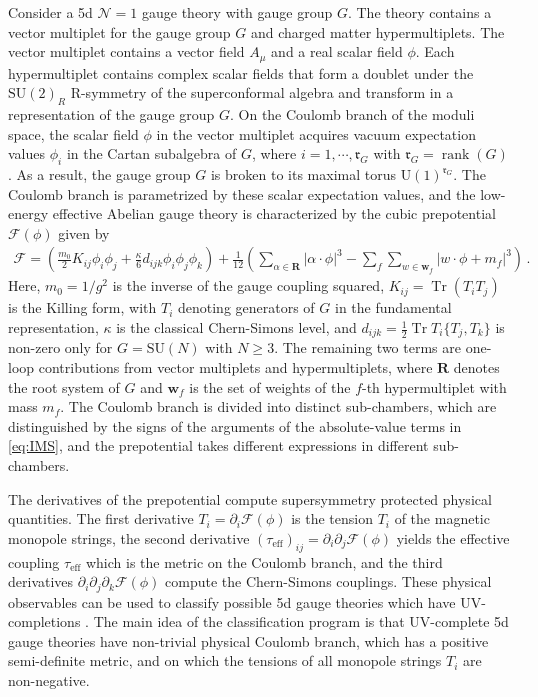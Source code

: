 \documentclass[11pt, a4paper]{article}
\DeclareMathOperator{\rank}{rank}
\DeclareMathOperator{\Tr}{Tr}
\theoremstyle{definition}
\begin{document}
Consider a 5d $ \mathcal{N}=1 $ gauge theory with gauge group $ G $. The theory contains a vector multiplet for the gauge group $ G $ and charged matter hypermultiplets. The vector multiplet contains a vector field $ A_\mu $ and a real scalar field $ \phi $. Each hypermultiplet contains complex scalar fields that form a doublet under the $ \mathrm{SU}(2)_R $ R-symmetry of the superconformal algebra and transform in a representation of the gauge group $ G $. On the Coulomb branch of the moduli space, the scalar field $ \phi $ in the vector multiplet acquires vacuum expectation values $ \phi_i $ in the Cartan subalgebra of $ G $, where $ i=1,\cdots,\mathfrak{r}_G $ with $ \mathfrak{r}_G=\rank(G) $. As a result, the gauge group $ G $ is broken to its maximal torus $ \mathrm{U}(1)^{\mathfrak{r}_G} $. The Coulomb branch is parametrized by these scalar expectation values, and the low-energy effective Abelian gauge theory is characterized by the cubic prepotential $ \mathcal{F}(\phi) $ given by \cite{Witten:1996qb,Seiberg:1996bd, Intriligator:1997pq}
\begin{align}\label{eq:IMS}
    \mathcal{F} = \left(\frac{m_0}{2} K_{ij} \phi_i \phi_j + \frac{\kappa}{6} d_{ijk} \phi_i \phi_j \phi_k\right) + \frac{1}{12} \left( \sum_{\alpha \in \mathbf{R}} |\alpha \cdot \phi|^3 - \sum_f \sum_{w \in \mathbf{w}_f} |w\cdot \phi + m_f|^3  \right) \, .
\end{align}
Here, $ m_0 = 1/g^2 $ is the inverse of the gauge coupling squared, $ K_{ij} = \Tr(T_i T_j) $ is the Killing form, with $ T_i $ denoting generators of $ G $ in the fundamental representation, $ \kappa $ is the classical Chern-Simons level, and $ d_{ijk} = \frac{1}{2} \Tr T_i \{T_j, T_k\} $ is non-zero only for $ G = \mathrm{SU}(N) $ with $ N \geq 3 $. The remaining two terms are one-loop contributions from vector multiplets and hypermultiplets, where $ \mathbf{R} $ denotes the root system of $ G $ and $ \mathbf{w}_f $ is the set of weights of the $ f $-th hypermultiplet with mass $ m_f $. The Coulomb branch is divided into distinct sub-chambers, which are distinguished by the signs of the arguments of the absolute-value terms in \eqref{eq:IMS}, and the prepotential takes different expressions in different sub-chambers.

The derivatives of the prepotential compute supersymmetry protected physical quantities. The first derivative $ T_i = \partial_i \mathcal{F}(\phi) $ is the tension $ T_i $ of the magnetic monopole strings, the second derivative $ (\tau_{\mathrm{eff}})_{ij} = \partial_i \partial_j \mathcal{F}(\phi) $ yields the effective coupling $ \tau_{\mathrm{eff}} $ which is the metric on the Coulomb branch, and the third derivatives $ \partial_i \partial_j \partial_k \mathcal{F}(\phi) $ compute the Chern-Simons couplings. These physical observables can be used to classify possible 5d gauge theories which have UV-completions \cite{Intriligator:1997pq, Jefferson:2017ahm}. The main idea of the classification program is that UV-complete 5d gauge theories have non-trivial physical Coulomb branch, which has a positive semi-definite metric, and on which the tensions of all monopole strings $ T_i $ are non-negative. 
\end{document}
